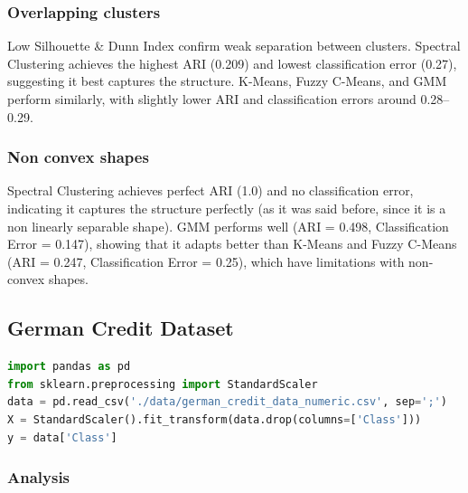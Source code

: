 \documentclass[11pt,a4paper]{article}
\begin{document}
\subsubsection*{Overlapping clusters}
Low Silhouette \& Dunn Index confirm weak separation between clusters. Spectral Clustering achieves the highest ARI (0.209) and lowest classification error (0.27), suggesting it best captures the structure. K-Means, Fuzzy C-Means, and GMM perform similarly, with slightly lower ARI and classification errors around 0.28--0.29.

\subsubsection*{Non convex shapes}
Spectral Clustering achieves perfect ARI (1.0) and no classification error, indicating it captures the structure perfectly (as it was said before, since it is a non linearly separable shape). GMM performs well (ARI = 0.498, Classification Error = 0.147), showing that it adapts better than K-Means and Fuzzy C-Means (ARI = 0.247, Classification Error = 0.25), which have limitations with non-convex shapes.

\subsection{German Credit Dataset}

\begin{lstlisting}[language=Python]
import pandas as pd
from sklearn.preprocessing import StandardScaler
data = pd.read_csv('./data/german_credit_data_numeric.csv', sep=';')
X = StandardScaler().fit_transform(data.drop(columns=['Class']))
y = data['Class']
\end{lstlisting}

\subsubsection{Analysis}
\end{document}
